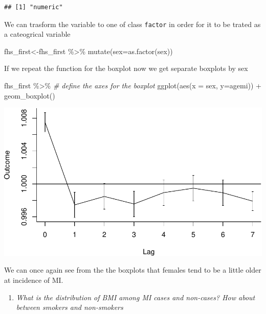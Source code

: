 \documentclass[
]{book}
\newenvironment{Shaded}{\begin{snugshade}}{\end{snugshade}}
\newcommand{\AttributeTok}[1]{\textcolor[rgb]{0.77,0.63,0.00}{#1}}
\newcommand{\CommentTok}[1]{\textcolor[rgb]{0.56,0.35,0.01}{\textit{#1}}}
\newcommand{\FunctionTok}[1]{\textcolor[rgb]{0.00,0.00,0.00}{#1}}
\newcommand{\NormalTok}[1]{#1}
\newcommand{\OtherTok}[1]{\textcolor[rgb]{0.56,0.35,0.01}{#1}}
\newcommand{\SpecialCharTok}[1]{\textcolor[rgb]{0.00,0.00,0.00}{#1}}
\providecommand{\tightlist}{%
  \setlength{\itemsep}{0pt}\setlength{\parskip}{0pt}}
\begin{document}
\begin{verbatim}
## [1] "numeric"
\end{verbatim}

We can trasform the variable to one of class \texttt{factor} in order for it to be trated as a cateogrical variable

\begin{Shaded}
\begin{Highlighting}[]
\NormalTok{fhs\_first}\OtherTok{\textless{}{-}}\NormalTok{fhs\_first }\SpecialCharTok{\%\textgreater{}\%} 
\FunctionTok{mutate}\NormalTok{(}\AttributeTok{sex=}\FunctionTok{as.factor}\NormalTok{(sex))}
\end{Highlighting}
\end{Shaded}

If we repeat the function for the boxplot now we get separate boxplots by sex

\begin{Shaded}
\begin{Highlighting}[]
\NormalTok{fhs\_first }\SpecialCharTok{\%\textgreater{}\%} 
  \CommentTok{\# define the axes for the boxplot}
  \FunctionTok{ggplot}\NormalTok{(}\FunctionTok{aes}\NormalTok{(}\AttributeTok{x =}\NormalTok{ sex, }\AttributeTok{y=}\NormalTok{agemi)) }\SpecialCharTok{+} 
  \FunctionTok{geom\_boxplot}\NormalTok{()}
\end{Highlighting}
\end{Shaded}

\includegraphics{adv_epi_analysis_files/figure-latex/unnamed-chunk-95-1.pdf}

We can once again see from the the boxplots that females tend to be a little older at incidence of MI.

\begin{enumerate}
\def\labelenumi{\arabic{enumi}.}
\setcounter{enumi}{4}
\tightlist
\item
  \emph{What is the distribution of BMI among MI cases and non-cases? How about between smokers and non-smokers}
\end{enumerate}
\end{document}

